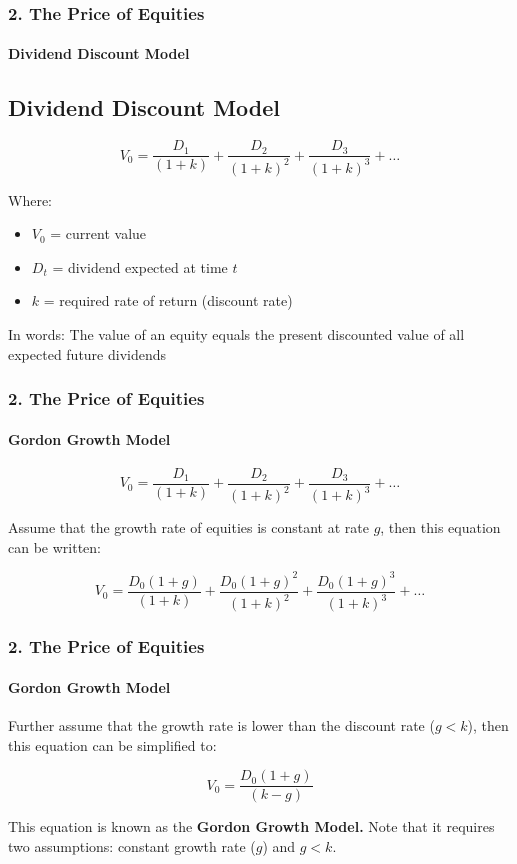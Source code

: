 \documentclass{beamer}
\begin{document}
\begin{frame}[t]
    \frametitle{2. The Price of Equities}
    \framesubtitle{Dividend Discount Model}
    \subsection{Dividend Discount Model}

    $$
    V_0 = \frac{D_1}{(1+k)} + \frac{D_2}{(1+k)^2} + \frac{D_3}{(1+k)^3} + \dots$$
    \vspace{1em}

    Where:
    \begin{itemize}
        \item $V_0$ = current value
        \item $D_t$ = dividend expected at time $t$
        \item $k$ = required rate of return (discount rate)
    \end{itemize}
    \vspace{1em}
    
    In words: The value of an equity equals the present discounted value of all expected future dividends

\end{frame}

\begin{frame}[t]
    \frametitle{2. The Price of Equities}
    \framesubtitle{Gordon Growth Model}

    $$
    V_0 = \frac{D_1}{(1+k)} + \frac{D_2}{(1+k)^2} + \frac{D_3}{(1+k)^3} + \dots$$
    \vspace{1em}
    
    Assume that the growth rate of equities is constant at rate $g$, then this equation can be written:

        $$
    V_0 = \frac{D_0(1+g)}{(1+k)} + \frac{D_0(1+g)^2}{(1+k)^2} + \frac{D_0(1+g)^3}{(1+k)^3} + \dots$$

\end{frame}

\begin{frame}[t]
    \frametitle{2. The Price of Equities}
    \framesubtitle{Gordon Growth Model}

    Further assume that the growth rate is lower than the discount rate ($g<k$), then this equation can be simplified to:
    \vspace{1em}

    $$
    V_0 = \frac{D_0(1+g)}{(k-g)}
    $$


    This equation is known as the \textbf{Gordon Growth Model.}   Note that it requires two assumptions: constant growth rate ($g$) and $g<k$.

    
\end{frame}
\end{document}
